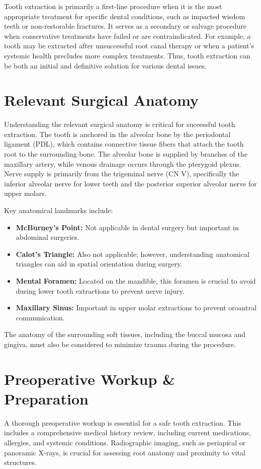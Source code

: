 Tooth extraction is primarily a first-line procedure when it is the most appropriate treatment for specific dental conditions, such as impacted wisdom teeth or non-restorable fractures. It serves as a secondary or salvage procedure when conservative treatments have failed or are contraindicated. For example, a tooth may be extracted after unsuccessful root canal therapy or when a patient's systemic health precludes more complex treatments. Thus, tooth extraction can be both an initial and definitive solution for various dental issues.

\section*{Relevant Surgical Anatomy}
Understanding the relevant surgical anatomy is critical for successful tooth extraction. The tooth is anchored in the alveolar bone by the periodontal ligament (PDL), which contains connective tissue fibers that attach the tooth root to the surrounding bone. The alveolar bone is supplied by branches of the maxillary artery, while venous drainage occurs through the pterygoid plexus. Nerve supply is primarily from the trigeminal nerve (CN V), specifically the inferior alveolar nerve for lower teeth and the posterior superior alveolar nerve for upper molars. 

Key anatomical landmarks include:

\begin{itemize}
  \item \textbf{McBurney's Point:} Not applicable in dental surgery but important in abdominal surgeries.
  \item \textbf{Calot's Triangle:} Also not applicable; however, understanding anatomical triangles can aid in spatial orientation during surgery.
  \item \textbf{Mental Foramen:} Located on the mandible, this foramen is crucial to avoid during lower tooth extractions to prevent nerve injury.
  \item \textbf{Maxillary Sinus:} Important in upper molar extractions to prevent oroantral communication.
\end{itemize}

The anatomy of the surrounding soft tissues, including the buccal mucosa and gingiva, must also be considered to minimize trauma during the procedure.

\section*{Preoperative Workup \& Preparation}
A thorough preoperative workup is essential for a safe tooth extraction. This includes a comprehensive medical history review, including current medications, allergies, and systemic conditions. Radiographic imaging, such as periapical or panoramic X-rays, is crucial for assessing root anatomy and proximity to vital structures.

